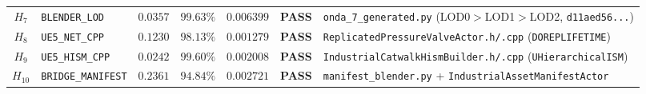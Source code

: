 \documentclass[10pt,a4paper]{article}
\begin{document}
\begin{table}[!htbp]
\begin{tabularx}{\linewidth}{@{}clrrrrY@{}}
$H_7$ & \texttt{BLENDER\_\allowbreak{}LOD} & $0.0357$ & $99.63\%$ & $0.006399$ & \textbf{PASS} & \texttt{onda\_\allowbreak{}7\_\allowbreak{}generated.py} (LOD0$>$LOD1$>$LOD2, \texttt{d11aed56...}) \\
$H_8$ & \texttt{UE5\_\allowbreak{}NET\_\allowbreak{}CPP} & $0.1230$ & $98.13\%$ & $0.001279$ & \textbf{PASS} & \texttt{ReplicatedPressureValveActor.h/.cpp} (\texttt{DOREPLIFETIME}) \\
$H_9$ & \texttt{UE5\_\allowbreak{}HISM\_\allowbreak{}CPP} & $0.0242$ & $99.60\%$ & $0.002008$ & \textbf{PASS} & \texttt{IndustrialCatwalkHismBuilder.h/.cpp} (\texttt{UHierarchicalISM}) \\
$H_{10}$ & \texttt{BRIDGE\_\allowbreak{}MANIFEST} & $0.2361$ & $94.84\%$ & $0.002721$ & \textbf{PASS} & \texttt{manifest\_\allowbreak{}blender.py} + \texttt{IndustrialAssetManifestActor} \\
\bottomrule
\end{tabularx}


\end{table}
\end{document}
